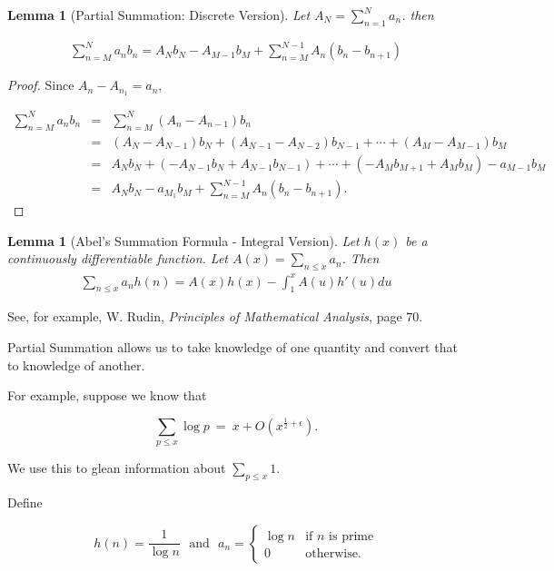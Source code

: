 \documentclass[12pt,letterpaper]{report}
\newcommand\be{\begin{equation}}
\newcommand\ee{\end{equation}}
\newcommand\bea{\begin{eqnarray}}
\newcommand\eea{\end{eqnarray}}
\newcommand{\foh}{\frac{1}{2}}  %
\newtheorem{lem}[thm]{Lemma}
\begin{document}
\begin{lem}[Partial Summation: Discrete
Version]\label{lempartialsummationdiscrete} Let $A_N =
\sum_{n=1}^N a_n$. then

\begin{eqnarray}
\sum_{n=M}^N a_n b_n = A_N b_N - A_{M-1} b_M + \sum_{n=M}^{N-1}
A_n (b_n - b_{n+1})
\end{eqnarray}

\end{lem}

\begin{proof}

Since $A_n - A_{n_1} = a_n$,

\bea
\sum_{n=M}^N a_n b_n &= & \sum_{n=M}^N (A_n-A_{n-1}) b_n \nonumber\\
&= & (A_N - A_{N-1}) b_N + (A_{N-1} - A_{N-2}) b_{N-1} +\dotsb +
(A_M - A_{M-1}) b_M \nonumber\\ &= & A_N b_N + (- A_{N-1} b_N +
A_{N-1} b_{N-1})
+ \dotsb + (-A_M b_{M+1} + A_M b_M) - a_{M-1} b_M \nonumber\\
&= & A_N b_N - a_{M_1} b_M + \sum_{n=M}^{N-1} A_n (b_n - b_{n+1}).
\eea

\end{proof}

\begin{lem}[Abel's Summation Formula - Integral
Version]\label{partialsummationintegral} Let $h(x)$ be a
continuously differentiable function. Let $A(x) = \sum_{n \leq x}
a_n$. Then
\begin{eqnarray}
\sum_{n \leq x} a_n h(n) = A(x) h(x) - \int_1^x A(u) h'(u) du
\end{eqnarray}
\end{lem}

See, for example, W. Rudin, \emph{Principles of Mathematical
Analysis}, page $70$.

Partial Summation allows us to take knowledge of one quantity and
convert that to knowledge of another.

For example, suppose we know that

\be \sum_{p\le x} \log p \ = \ x + O(x^{\foh + \epsilon}).
 \ee

We use this to glean information about $\sum_{p \le x} 1$.

Define

\be h(n) = \frac{1}{\log n} \ \ \ \mbox{and} \ \ \ a_n =
\begin{cases} \log n & \text{if $n$ is prime}\\ 0
&\text{otherwise.} \end{cases} \ee
\end{document}

